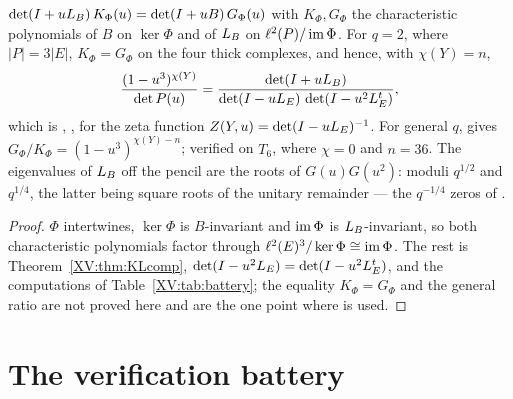 \begin{corollary}\label{XV:cor:KL}
$\det(I+uL_B)\,K_\Phi(u)=\det(I+uB)\,G_\Phi(u)$ with $K_\Phi,G_\Phi$ the characteristic
polynomials of $B$ on $\ker\Phi$ and of $L_B$ on $\ell^{2}(P)/\operatorname{im}\Phi$. For $q=2$, where
$|P|=3|E|$, $K_\Phi=G_\Phi$ on the four thick complexes, and hence, with $\chi(Y)=n$,
\[
\frac{(1-u^{3})^{\chi(Y)}}{\det P(u)}=\frac{\det(I+uL_B)}{\det(I-uL_E)\,\det(I-u^{2}L_E^{t})},
\]
which is \cite[Thm.~C]{KL}, \cite[eq.~(1.6)]{KLW}, for the zeta function
$Z(Y,u)=\det(I-uL_E)^{-1}$. For general $q$, \cite{KL} gives
$G_\Phi/K_\Phi=(1-u^{3})^{\chi(Y)-n}$; verified on $T_6$, where $\chi=0$ and $n=36$. The
eigenvalues of $L_B$ off the pencil are the roots of $G(u)G(u^{2})$: moduli $q^{1/2}$ and
$q^{1/4}$, the latter being square roots of the unitary remainder --- the $q^{-1/4}$ zeros
of \cite[Thm.~1.5.1(4)]{KLW}.
\end{corollary}

\begin{proof}
$\Phi$ intertwines, $\ker\Phi$ is $B$-invariant and $\operatorname{im}\Phi$ is $L_B$-invariant, so both
characteristic polynomials factor through $\ell^{2}(E)^{3}/\ker\Phi\cong\operatorname{im}\Phi$. The rest is
Theorem~\ref{XV:thm:KLcomp}, $\det(I-u^{2}L_E)=\det(I-u^{2}L_E^{t})$, and the computations of
Table~\ref{XV:tab:battery}; the equality $K_\Phi=G_\Phi$ and the general ratio are not proved
here and are the one point where \cite{KL} is used.
\end{proof}

\section{The verification battery}\label{XV:sec:battery}


